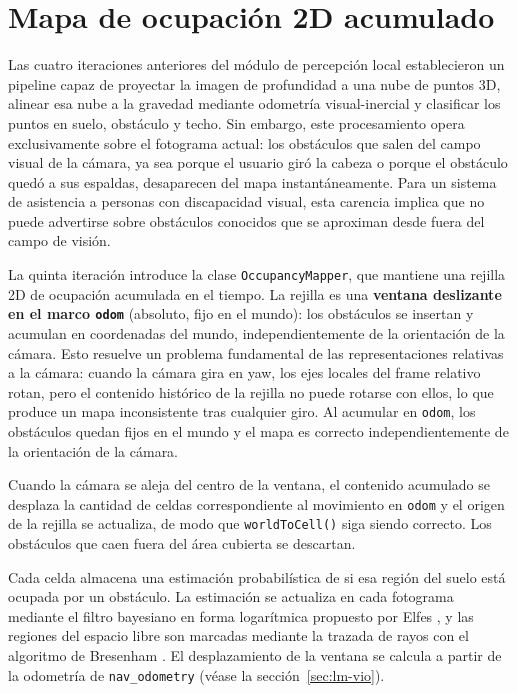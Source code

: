 %

\section{Mapa de ocupación 2D acumulado}
\label{sec:lm-occupancy}

Las cuatro iteraciones anteriores del módulo de percepción local establecieron
un pipeline capaz de proyectar la imagen de profundidad a una nube de puntos
3D, alinear esa nube a la gravedad mediante odometría visual-inercial y
clasificar los puntos en suelo, obstáculo y techo. Sin embargo, este
procesamiento opera exclusivamente sobre el fotograma actual: los obstáculos
que salen del campo visual de la cámara, ya sea porque el usuario giró la
cabeza o porque el obstáculo quedó a sus espaldas, desaparecen del mapa
instantáneamente. Para un sistema de asistencia a personas con discapacidad
visual, esta carencia implica que no puede advertirse sobre obstáculos
conocidos que se aproximan desde fuera del campo de visión.

La quinta iteración introduce la clase \texttt{OccupancyMapper}, que mantiene
una rejilla 2D de ocupación acumulada en el tiempo. La rejilla es una
\textbf{ventana deslizante en el marco \texttt{odom}} (absoluto, fijo en el
mundo): los obstáculos se insertan y acumulan en coordenadas del mundo,
independientemente de la orientación de la cámara. Esto resuelve un problema
fundamental de las representaciones relativas a la cámara: cuando la cámara
gira en yaw, los ejes locales del frame relativo rotan, pero el contenido
histórico de la rejilla no puede rotarse con ellos, lo que produce un mapa
inconsistente tras cualquier giro. Al acumular en \texttt{odom}, los
obstáculos quedan fijos en el mundo y el mapa es correcto
independientemente de la orientación de la cámara.

Cuando la cámara se aleja del centro de la ventana, el contenido acumulado
se desplaza la cantidad de celdas correspondiente al movimiento en
\texttt{odom} y el origen de la rejilla se actualiza, de modo que
\texttt{worldToCell()} siga siendo correcto. Los obstáculos que caen fuera
del área cubierta se descartan.

Cada celda almacena una estimación probabilística de si esa región del suelo
está ocupada por un obstáculo. La estimación se actualiza en cada fotograma
mediante el filtro bayesiano en forma logarítmica propuesto por Elfes
\cite{Elfes1989}, y las regiones del espacio libre son marcadas mediante la
trazada de rayos con el algoritmo de Bresenham \cite{Bresenham1965}. El
desplazamiento de la ventana se calcula a partir de la odometría de
\texttt{nav\_odometry} (véase la sección~\ref{sec:lm-vio}).

